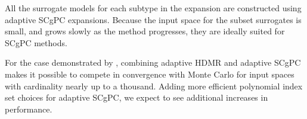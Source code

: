 All the surrogate models for each subtype in the expansion are constructed using adaptive SCgPC expansions.
Because the input space for the subset surrogates is small, and grows slowly as the method progresses, they
are ideally suited for SCgPC methods.

For the case demonstrated by \cite{Ayres}, combining adaptive HDMR and adaptive SCgPC makes it possible to
compete in convergence with Monte Carlo for input spaces with cardinality nearly up to a thousand.  Adding
more efficient polynomial index set choices for adaptive SCgPC, we expect to see additional increases in 
performance.
